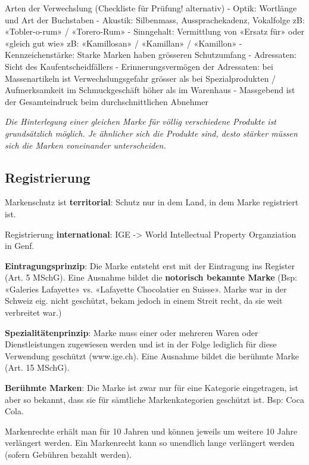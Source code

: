 Arten der Verwechslung (Checkliste für Prüfung! alternativ) - Optik:
Wortlänge und Art der Buchstaben - Akustik: Silbenmass,
Aussprachekadenz, Vokalfolge zB: «Tobler-o-rum» / «Torero-Rum» -
Sinngehalt: Vermittlung von «Ersatz für» oder «gleich gut wie» zB:
«Kamillosan» / «Kamillan» / «Kamillon» - Kennzeichenstärke: Starke
Marken haben grösseren Schutzumfang - Adressaten: Sicht des
Kaufentscheidfällers - Erinnerungsvermögen der Adressaten: bei
Massenartikeln ist Verwechslungsgefahr grösser als bei Spezialprodukten
/ Aufmerksamkeit im Schmuckgeschäft höher als im Warenhaus - Massgebend
ist der Gesamteindruck beim durchschnittlichen Abnehmer

\emph{Die Hinterlegung einer gleichen Marke für völlig verschiedene
Produkte ist grundsätzlich möglich. Je ähnlicher sich die Produkte sind,
desto stärker müssen sich die Marken voneinander unterscheiden.}

\hypertarget{registrierung}{%
\subsection{Registrierung}\label{registrierung}}

Markenschutz ist \textbf{territorial}: Schutz nur in dem Land, in dem
Marke registriert ist.

Registrierung \textbf{international}: IGE -\textgreater{} World
Intellectual Property Organziation in Genf.

\textbf{Eintragungsprinzip}: Die Marke entsteht erst mit der Eintragung
ins Register (Art. 5 MSchG). Eine Ausnahme bildet die \textbf{notorisch
bekannte Marke} (Bsp: «Galeries Lafayette» vs. «Lafayette Chocolatier en
Suisse». Marke war in der Schweiz eig. nicht geschützt, bekam jedoch in
einem Streit recht, da sie weit verbreitet war.)

\textbf{Spezialitätenprinzip}: Marke muss einer oder mehreren Waren oder
Dienstleistungen zugewiesen werden und ist in der Folge lediglich für
diese Verwendung geschützt (www.ige.ch). Eine Ausnahme bildet die
berühmte Marke (Art. 15 MSchG).

\textbf{Berühmte Marken}: Die Marke ist zwar nur für eine Kategorie
eingetragen, ist aber so bekannt, dass sie für sämtliche
Markenkategorien geschützt ist. Bsp: Coca Cola.

Markenrechte erhält man für 10 Jahren und können jeweils um weitere 10
Jahre verlängert werden. Ein Markenrecht kann so unendlich lange
verlängert werden (sofern Gebühren bezahlt werden).

